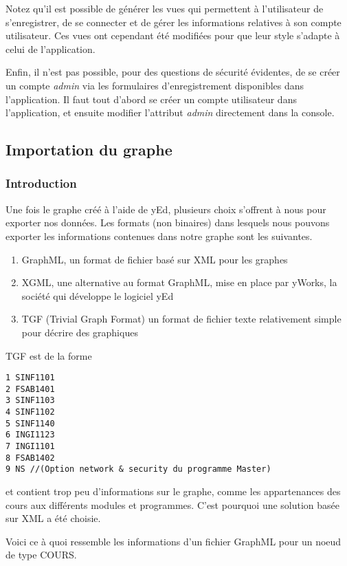 Notez qu'il est possible de générer les vues qui permettent à l'utilisateur de s'enregistrer, de se connecter et de gérer les informations relatives à son compte utilisateur. Ces vues ont cependant été modifiées pour que leur style s'adapte à celui de l'application. 

Enfin, il n'est pas possible, pour des questions de sécurité évidentes, de se créer un compte \textit{admin} via les formulaires d'enregistrement disponibles dans l'application. Il faut tout d'abord se créer un compte utilisateur dans l'application, et ensuite modifier l'attribut \textit{admin} directement dans la console.  

\subsection{Importation du graphe}
\subsubsection{Introduction}
\label{graph_format_justification}
Une fois le graphe créé à l'aide de yEd, plusieurs choix s'offrent à nous pour exporter nos données. Les formats (non binaires) dans lesquels nous pouvons exporter les informations contenues dans notre graphe sont les suivantes. 
\begin{enumerate}
\item GraphML, un format de fichier basé sur XML pour les graphes
\item XGML, une alternative au format GraphML, mise en place par yWorks, la société qui développe le logiciel yEd
\item TGF (Trivial Graph Format) un format de fichier texte relativement simple pour décrire des graphiques
\end{enumerate}

TGF est de la forme

\begin{lstlisting}
1 SINF1101
2 FSAB1401
3 SINF1103
4 SINF1102
5 SINF1140
6 INGI1123
7 INGI1101
8 FSAB1402
9 NS //(Option network & security du programme Master)
\end{lstlisting}

et contient trop peu d'informations sur le graphe, comme les appartenances des cours aux différents modules et programmes. C'est pourquoi une solution basée sur XML a été choisie.

Voici ce à quoi ressemble les informations d'un fichier GraphML pour un noeud de type COURS.

